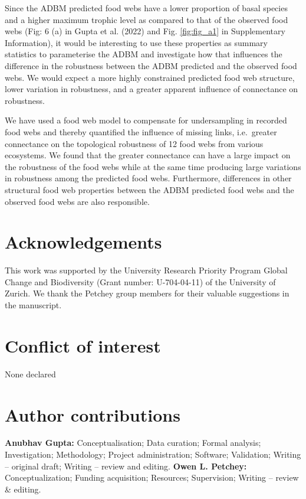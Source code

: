 \documentclass{article}
\begin{document}
Since the ADBM predicted food webs have a lower proportion of basal
species and a higher maximum trophic level as compared to that of the
observed food webs (Fig: 6 (a) in Gupta et al. (2022) and Fig.
\ref{fig:fig_a1} in Supplementary Information), it would be interesting
to use these properties as summary statistics to parameterise the ADBM
and investigate how that influences the difference in the robustness
between the ADBM predicted and the observed food webs. We would expect a
more highly constrained predicted food web structure, lower variation in
robustness, and a greater apparent influence of connectance on
robustness.

We have used a food web model to compensate for undersampling in
recorded food webs and thereby quantified the influence of missing
links, i.e.~greater connectance on the topological robustness of 12 food
webs from various ecosystems. We found that the greater connectance can
have a large impact on the robustness of the food webs while at the same
time producing large variations in robustness among the predicted food
webs. Furthermore, differences in other structural food web properties
between the ADBM predicted food webs and the observed food webs are also
responsible.

\hypertarget{acknowledgements}{%
\section{Acknowledgements}\label{acknowledgements}}

This work was supported by the University Research Priority Program
Global Change and Biodiversity (Grant number: U-704-04-11) of the
University of Zurich. We thank the Petchey group members for their
valuable suggestions in the manuscript.

\hypertarget{conflict-of-interest}{%
\section{Conflict of interest}\label{conflict-of-interest}}

None declared

\hypertarget{author-contributions}{%
\section{Author contributions}\label{author-contributions}}

\textbf{Anubhav Gupta:} Conceptualisation; Data curation; Formal
analysis; Investigation; Methodology; Project administration; Software;
Validation; Writing -- original draft; Writing -- review and editing.
\textbf{Owen L. Petchey:} Conceptualization; Funding acquisition;
Resources; Supervision; Writing -- review \& editing.
\end{document}
